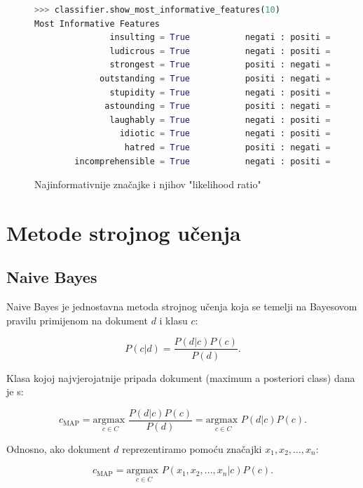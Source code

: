 \documentclass[conference]{IEEEtran}
\begin{document}
\begin{figure}[!ht]
\begin{minipage}{0.5\textwidth}
\centering
\begin{lstlisting}[language = Python, frame = single, basicstyle=\tiny\ttfamily, xleftmargin = 5pt, xrightmargin = 5pt]
>>> classifier.show_most_informative_features(10)
Most Informative Features
               insulting = True           negati : positi =     16.9 : 1.0
               ludicrous = True           negati : positi =     12.5 : 1.0
               strongest = True           positi : negati =     11.8 : 1.0
             outstanding = True           positi : negati =     11.5 : 1.0
               stupidity = True           negati : positi =     11.3 : 1.0
              astounding = True           positi : negati =     11.1 : 1.0
               laughably = True           negati : positi =     10.9 : 1.0
                 idiotic = True           negati : positi =     10.5 : 1.0
                  hatred = True           positi : negati =     10.4 : 1.0
        incomprehensible = True           negati : positi =      8.9 : 1.0
\end{lstlisting}
\caption{Najinformativnije značajke i njihov "likelihood ratio"}
\end{minipage}
\end{figure}

\section{Metode strojnog učenja}

\subsection{Naive Bayes}

Naive Bayes je jednostavna metoda strojnog učenja koja se temelji na Bayesovom pravilu primijenom na dokument $d$ i klasu $c$:

\[P(c|d) = \frac{P(d|c)P(c)}{P(d)}.\]

Klasa kojoj najvjerojatnije pripada dokument (maximum a posteriori class) dana je s:

\[c_{\text{MAP}} = \underset{{c \in C}}{\text{argmax }} \frac{P(d|c)P(c)}{P(d)}
= \underset{{c \in C}}{\text{argmax }} P(d|c)P(c).\] 

Odnosno, ako dokument $d$ reprezentiramo pomoću značajki $x_1, x_2, \ldots, x_n$:

\[c_{\text{MAP}} = \underset{{c \in C}}{\text{argmax }} P(x_1, x_2, \ldots, x_n|c)P(c).\]
\end{document}
